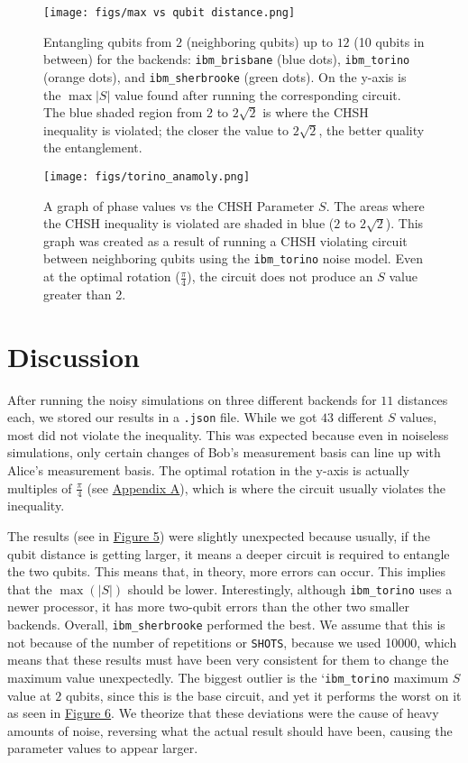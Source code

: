 \documentclass[a4paper, onecolumn, 11pt, titlepage]{quantumarticle}
\begin{document}
\begin{figure}
    \centering
    \texttt{[image: figs/max vs qubit distance.png]}
    \caption{Entangling qubits from $2$ (neighboring qubits) up to $12$ (10 qubits in between) for the backends: \texttt{ibm\_brisbane} (blue dots), \texttt{ibm\_torino} (orange dots), and \texttt{ibm\_sherbrooke} (green dots). On the y-axis is the $\max|S|$ value found after running the corresponding circuit. The blue shaded region from $2$ to $2\sqrt{2}$ is where the CHSH inequality is violated; the closer the value to $2\sqrt{2}$, the better quality the entanglement.}
    \label{fig:all}
\end{figure}

\begin{figure}
    \centering
    \texttt{[image: figs/torino\_anamoly.png]}
    \caption{A graph of phase values vs the CHSH Parameter $S$. The areas where the CHSH inequality is violated are shaded in blue ($2$ to $2\sqrt{2}$). This graph was created as a result of running a CHSH violating circuit between neighboring qubits using the \texttt{ibm\_torino} noise model. Even at the optimal rotation ($\frac{\pi}{4}$), the circuit does not produce an $S$ value greater than 2.}
    \label{fig:torino}
\end{figure}

\section{Discussion}
After running the noisy simulations on three different backends for $11$ distances each, we stored our results in a \verb|.json| file. While we got $43$ different $S$ values, most did not violate the inequality. This was expected because even in noiseless simulations, only certain changes of Bob’s measurement basis can line up with Alice’s measurement basis. The optimal rotation in the y-axis is actually multiples of $\frac{\pi}{4}$ (see \hyperref[firstappendix]{Appendix A}), which is where the circuit usually violates the inequality. 

The results (see in \hyperref[fig:all]{Figure 5}) were slightly unexpected because usually, if the qubit distance is getting larger, it means a deeper circuit is required to entangle the two qubits. This means that, in theory, more errors can occur. This implies that the $\max(|S|)$ should be lower. Interestingly, although \verb|ibm_torino| uses a newer processor, it has more two-qubit errors than the other two smaller backends. Overall, \verb|ibm_sherbrooke| performed the best. We assume that this is not because of the number of repetitions or \verb|SHOTS|, because we used 10000, which means that these results must have been very consistent for them to change the maximum value unexpectedly. The biggest outlier is the `\verb|ibm_torino| maximum $S$ value at $2$ qubits, since this is the base circuit, and yet it performs the worst on it as seen in \hyperref[fig:torino]{Figure 6}. We theorize that these deviations were the cause of heavy amounts of noise, reversing what the actual result should have been, causing the parameter values to appear larger. 
\end{document}
